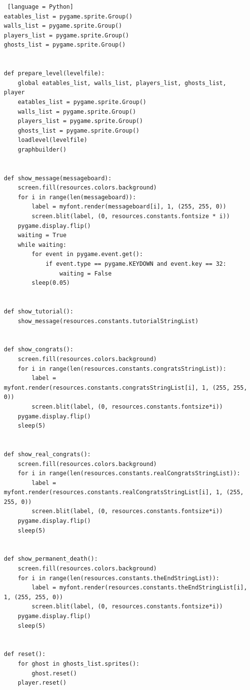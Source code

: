 \documentclass[11pt,a4paper,notitlepage]{report}
\begin{document}
\begin{lstlisting} [language = Python]
eatables_list = pygame.sprite.Group()
walls_list = pygame.sprite.Group()
players_list = pygame.sprite.Group()
ghosts_list = pygame.sprite.Group()


def prepare_level(levelfile):
    global eatables_list, walls_list, players_list, ghosts_list, player
    eatables_list = pygame.sprite.Group()
    walls_list = pygame.sprite.Group()
    players_list = pygame.sprite.Group()
    ghosts_list = pygame.sprite.Group()
    loadlevel(levelfile)
    graphbuilder()


def show_message(messageboard):
    screen.fill(resources.colors.background)
    for i in range(len(messageboard)):
        label = myfont.render(messageboard[i], 1, (255, 255, 0))
        screen.blit(label, (0, resources.constants.fontsize * i))
    pygame.display.flip()
    waiting = True
    while waiting:
        for event in pygame.event.get():
            if event.type == pygame.KEYDOWN and event.key == 32:
                waiting = False
        sleep(0.05)


def show_tutorial():
    show_message(resources.constants.tutorialStringList)


def show_congrats():
    screen.fill(resources.colors.background)
    for i in range(len(resources.constants.congratsStringList)):
        label = myfont.render(resources.constants.congratsStringList[i], 1, (255, 255, 0))
        screen.blit(label, (0, resources.constants.fontsize*i))
    pygame.display.flip()
    sleep(5)


def show_real_congrats():
    screen.fill(resources.colors.background)
    for i in range(len(resources.constants.realCongratsStringList)):
        label = myfont.render(resources.constants.realCongratsStringList[i], 1, (255, 255, 0))
        screen.blit(label, (0, resources.constants.fontsize*i))
    pygame.display.flip()
    sleep(5)


def show_permanent_death():
    screen.fill(resources.colors.background)
    for i in range(len(resources.constants.theEndStringList)):
        label = myfont.render(resources.constants.theEndStringList[i], 1, (255, 255, 0))
        screen.blit(label, (0, resources.constants.fontsize*i))
    pygame.display.flip()
    sleep(5)


def reset():
    for ghost in ghosts_list.sprites():
        ghost.reset()
    player.reset()



\end{lstlisting}
\end{document}

